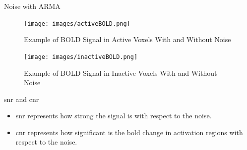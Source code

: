 \documentclass{beamer}
\begin{document}
\begin{frame}{Noise with ARMA}
\begin{table}
\centering
\caption{Parameter Selection Related to $\bm{\epsilon}$}
\label{tab:parSelE}
\end{table}
\end{frame}

\begin{frame}
\begin{figure}
\centering
\texttt{[image: images/activeBOLD.png]}
\caption{Example of BOLD Signal in Active Voxels With and Without Noise}
\end{figure}
\end{frame}

\begin{frame}
\begin{figure}
\centering
\texttt{[image: images/inactiveBOLD.png]}
\caption{Example of BOLD Signal in Inactive Voxels With and Without Noise}
\end{figure}
\end{frame}

\begin{frame}{\acrshort{snr} and \acrshort{cnr}}
\begin{itemize}
\item \acrfull{snr} represents how strong the signal is with respect to the noise.
\item \acrfull{cnr} represents how significant is the \gls{bold} change in 
activation regions with respect to the noise.
\end{itemize}
\end{frame}
\end{document}

